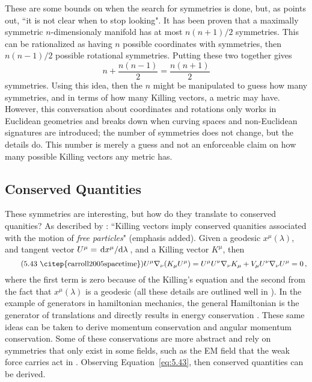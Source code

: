 \documentclass[11pt]{article}
\begin{document}
These are some bounds on when the search for symmetries is done, but, as \cite{carroll2005spacetime} points out, ``it is not clear when to stop looking". It has been proven that a maximally symmetric $n$-dimensionaly manifold has at most $n(n+1)/2$ symmetries. This can be rationalized as having $n$ possible coordinates with symmetries, then $n(n-1)/2$ possible rotational symmetries. Putting these two together gives 
\[n + \frac{n(n-1)}{2} = \frac{n(n+1)}{2}\]
symmetries. Using this idea, then the $n$ might be manipulated to guess how many symmetries, and in terms of how many Killing vectors, a metric may have. However, this conversation about coordinates and rotations only works in Euclidean geometries and breaks down when curving spaces and non-Euclidean signatures are introduced; the number of symmetries does not change, but the details do. This number is merely a guess and not an enforceable claim on how many possible Killing vectors any metric has. 
 
\subsection{Conserved Quantities}
These symmetries are interesting, but how do they translate to conserved quanities? As described by \cite{carroll2005spacetime}: ``Killing vectors imply conserved quanities associated with the motion of \textit{free particles}" (emphasis added). Given a geodesic $x^\mu(\lambda)$, and tangent vector $U^\mu = \dv*{x^\mu}{\lambda}$, and a Killing vector $K^\mu$, then
\begin{equation}
\tag{5.43 \citep{carroll2005spacetime}}
U^\mu \nabla_\nu(K_\mu U^\mu)= U^\mu U^\nu \nabla_\nu K_\mu +V_\mu U^\nu \nabla_\nu U^\mu = 0 \, ,
\label{eq:5.43}
\end{equation}
where the first term is zero because of the Killing's equation and the second from the fact that $x^\mu(\lambda)$ is a geodesic (all these details are outlined well in \cite{carroll2005spacetime}). In the example of generators in hamiltonian mechanics, the general Hamiltonian is the generator of translations and directly results in energy conservation \cite{griffiths_qm}. These same ideas can be taken to derive momentum conservation and angular momentum conservation. Some of these conservations are more abstract and rely on symmetries that only exist in some fields, such as the EM field that the weak force carries act in \cite{griffiths_part}. Observing Equation~\ref{eq:5.43}, then conserved quantities can be derived. 
\end{document}
